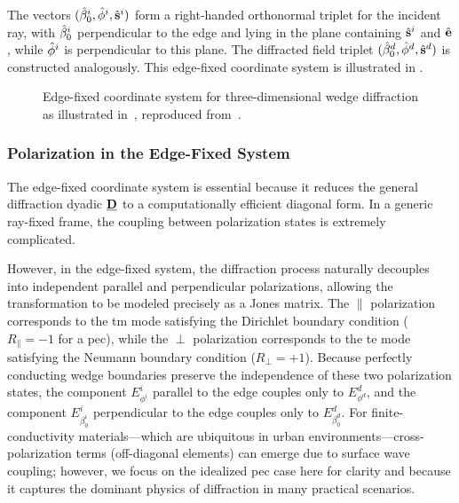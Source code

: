 The vectors $(\hat{\mathbf{\beta}}_0^i, \hat{\mathbf{\phi}}^i, \hat{\mathbf{s}}^i)$ form a right-handed orthonormal triplet for the incident ray, with $\hat{\mathbf{\beta}}_0^i$ perpendicular to the edge and lying in the plane containing $\hat{\mathbf{s}}^i$ and $\hat{\mathbf{e}}$, while $\hat{\mathbf{\phi}}^i$ is perpendicular to this plane. The diffracted field triplet $(\hat{\mathbf{\beta}}_0^d, \hat{\mathbf{\phi}}^d, \hat{\mathbf{s}}^d)$ is constructed analogously. This edge-fixed coordinate system is illustrated in .

\begin{figure}
  \centering
  \caption{Edge-fixed coordinate system for three-dimensional wedge diffraction as illustrated in~, reproduced from~\cite[Fig.~6.2]{McNamara1990}.}
\end{figure}

\subsubsection{Polarization in the Edge-Fixed System}

The edge-fixed coordinate system is essential because it reduces the general diffraction dyadic $\underline{\mathbf{D}}$ to a computationally efficient diagonal form. In a generic ray-fixed frame, the coupling between polarization states is extremely complicated.

However, in the edge-fixed system, the diffraction process naturally decouples into independent parallel and perpendicular polarizations, allowing the transformation to be modeled precisely as a Jones matrix. The $\parallel$ polarization corresponds to the \gls{tm} mode satisfying the Dirichlet boundary condition ($R_\parallel = -1$ for a \gls{pec}), while the $\perp$ polarization corresponds to the \gls{te} mode satisfying the Neumann boundary condition ($R_\perp = +1$). Because perfectly conducting wedge boundaries preserve the independence of these two polarization states, the component $E_{\phi^i}^i$ parallel to the edge couples only to $E_{\phi^d}^d$, and the component $E_{\beta_0^i}^i$ perpendicular to the edge couples only to $E_{\beta_0^d}^d$. For finite-conductivity materials---which are ubiquitous in urban environments---cross-polarization terms (off-diagonal elements) can emerge due to surface wave coupling; however, we focus on the idealized \gls{pec} case here for clarity and because it captures the dominant physics of diffraction in many practical scenarios.

